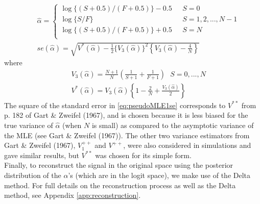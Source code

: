 \documentclass[12pt]{article}
\newcommand{\Ga}{\alpha}
\begin{document}
\begin{eqnarray}\label{eq:pseudoMLE1}
&&\hat{\Ga}=\left\{
\begin{array}{lll}
\log\{(S+0.5)/(F+0.5)\}-0.5&\ \ \ S=0\\
\log\{S/F\}&\ \ \ S=1,2,...,N-1\\
\log\{(S+0.5)/(F+0.5)\}+0.5&\ \ \ S=N\\
\end{array}
\right.\\ \label{eq:pseudoMLE1se}
&&se(\hat{\Ga})=\sqrt{V^*(\hat{\Ga})-\frac{1}{2}\{V_3(\hat{\Ga})\}^2\left\{V_3(\hat{\Ga})-\frac{4}{N}\right\}}
\end{eqnarray}
where
\begin{eqnarray}
&&V_3(\hat{\Ga})=\frac{N+1}{N}\left(\frac{1}{S+1}+\frac{1}{F+1}\right)\ \ \ S=0,...,N\\
\label{eq:pseudoMLE2}&&V^*(\hat{\Ga})=V_3(\hat{\Ga})\left\{1-\frac{2}{N}+\frac{V_3(\hat{\Ga})}{2}\right\}
\end{eqnarray}
The square of the standard error in \eqref{eq:pseudoMLE1se} corresponds to $V^{\ast\ast}$ from p. 182 of Gart \& Zweifel (1967), and is chosen because it is less biased for the true variance of $\hat{\Ga}$ (when $N$ is small) as compared to the asymptotic variance of the MLE (see Gart \& Zweifel (1967)). The other two variance estimators from Gart \& Zweifel (1967), $V_1^{++}$ and $V^{++}$, were also considered in simulations and gave similar results, but $V^{\ast\ast}$ was chosen for its simple form.\bigskip\\
Finally, to reconstruct the signal in the original space using the posterior distribution of the $\Ga$'s (which are in the logit space), we make use of the Delta method. For full details on the reconstruction process as well as the Delta method, see Appendix \ref{app:reconstruction}.
\end{document}
